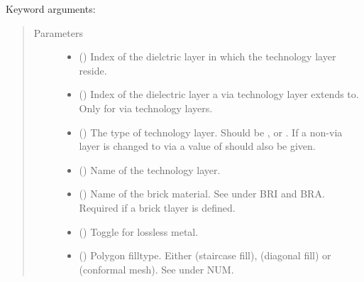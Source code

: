 \documentclass[letterpaper,10pt,english,openany]{sphinxmanual}
\begin{document}
\begin{fulllineitems}
\begin{fulllineitems}
\begin{quote}
\begin{description}
\end{description}\end{quote}

Keyword arguments:
\begin{quote}\begin{description}
\item[{Parameters}] \leavevmode\begin{itemize}
\item {} 
 () \textendash{} Index of the dielctric layer in which the technology layer reside.

\item {} 
 () \textendash{} Index of the dielectric layer a via technology layer extends to. Only for via technology layers.

\item {} 
 () \textendash{} The type of technology layer. Should be ,  or . If a non-via layer is changed to via a value of  should also be given.

\item {} 
 () \textendash{} Name of the technology layer.

\item {} 
 () \textendash{} Name of the brick material. See \label{\detokenize{source/sonpy:id23}}{\hyperref[\detokenize{source/users_guide:son15}]{\sphinxcrossref{{[}Son15{]}}}} under BRI and BRA. Required if a brick tlayer is defined.

\item {} 
 () \textendash{} Toggle for lossless metal.

\item {} 
 () \textendash{} Polygon filltype. Either  (staircase fill),  (diagonal fill) or  (conformal mesh). See \label{\detokenize{source/sonpy:id24}}{\hyperref[\detokenize{source/users_guide:son15}]{\sphinxcrossref{{[}Son15{]}}}} under NUM.


\end{itemize}
\end{description}
\end{quote}
\end{fulllineitems}
\end{fulllineitems}
\end{document}
